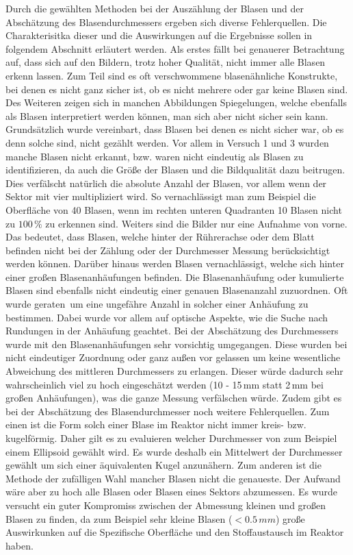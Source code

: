 \documentclass[12pt,liststotoc]{report}
\begin{document}
\label{Interpretation}Durch die gewählten Methoden bei der Auszählung der Blasen und der Abschätzung des Blasendurchmessers ergeben sich diverse Fehlerquellen. Die Charakterisitka dieser und die Auswirkungen auf die Ergebnisse sollen in folgendem Abschnitt erläutert werden. Als erstes fällt bei genauerer Betrachtung auf, dass sich auf den Bildern, trotz hoher Qualität, nicht immer alle Blasen erkenn lassen. Zum Teil sind es oft verschwommene blasenähnliche Konstrukte, bei denen es nicht ganz sicher ist, ob es nicht mehrere oder gar keine Blasen sind. Des Weiteren zeigen sich in manchen Abbildungen Spiegelungen, welche ebenfalls als Blasen interpretiert werden können, man sich aber nicht sicher sein kann. Grundsätzlich wurde vereinbart, dass Blasen bei denen es nicht sicher war, ob es denn solche sind, nicht gezählt werden. Vor allem in Versuch 1 und 3 wurden manche Blasen nicht erkannt, bzw. waren nicht eindeutig als Blasen zu identifizieren, da auch die Größe der Blasen und die Bildqualität dazu beitrugen. Dies verfälscht natürlich die absolute Anzahl der Blasen, vor allem wenn der Sektor mit vier multipliziert wird. So vernachlässigt man zum Beispiel die Oberfläche von 40 Blasen, wenn im rechten unteren Quadranten 10 Blasen nicht zu $100\,\%$ zu erkennen sind. Weiters sind die Bilder nur eine Aufnahme von vorne. Das bedeutet, dass Blasen, welche hinter der Rührerachse oder dem Blatt befinden nicht bei der Zählung oder der Durchmesser Messung berücksichtigt werden können. Darüber hinaus werden Blasen vernachlässigt, welche sich hinter einer großen Blasenanhäufungen befinden. Die Blasenanhäufung oder kumulierte Blasen sind ebenfalls nicht eindeutig einer genauen Blasenanzahl zuzuordnen. Oft wurde \glqq geraten\grqq\, um eine ungefähre Anzahl in solcher einer Anhäufung zu bestimmen. Dabei wurde vor allem auf optische Aspekte, wie die Suche nach Rundungen in der Anhäufung geachtet. Bei der Abschätzung des Durchmessers wurde mit den Blasenanhäufungen sehr vorsichtig umgegangen. Diese wurden bei nicht eindeutiger Zuordnung oder ganz außen vor gelassen um keine wesentliche Abweichung des mittleren Durchmessers zu erlangen. Dieser würde dadurch sehr wahrscheinlich viel zu hoch eingeschätzt werden (10 - 15\,mm statt 2\,mm bei großen Anhäufungen), was die ganze Messung verfälschen würde. Zudem gibt es bei der Abschätzung des Blasendurchmesser noch weitere Fehlerquellen. Zum einen ist die Form solch einer Blase im Reaktor nicht immer kreis- bzw. kugelförmig. Daher gilt es zu evaluieren welcher Durchmesser von zum Beispiel einem Ellipsoid gewählt wird. Es wurde deshalb ein Mittelwert der Durchmesser gewählt um sich einer äquivalenten Kugel anzunähern. Zum anderen ist die Methode der zufälligen Wahl mancher Blasen nicht die genaueste. Der Aufwand wäre aber zu hoch alle Blasen oder Blasen eines Sektors abzumessen. Es wurde versucht ein guter Kompromiss zwischen der Abmessung kleinen und großen Blasen zu finden, da zum Beispiel sehr kleine Blasen ($<0.5\,mm$) große Auswirkunken auf die Spezifische Oberfläche und den Stoffaustausch im Reaktor haben.\newline
\end{document}
